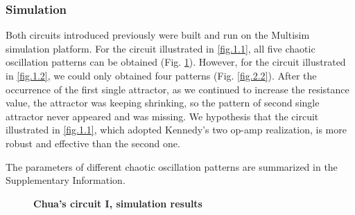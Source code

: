 \documentclass[10pt,a4paper,twocolumn,twoside,UTF8]{article}
\begin{document}
		\subsubsection{Simulation}
			Both circuits introduced previously were built and run on the Multisim simulation platform. 
			For the circuit illustrated in \ref{fig.1.1}, all five chaotic oscillation patterns can be obtained (Fig. \ref{fig.2.1}).
			However, for the circuit illustrated in \ref{fig.1.2}, we could only obtained four patterns (Fig. \ref{fig.2.2}).
			After the occurrence of the first single attractor, as we continued to increase the resistance value, the attractor was keeping shrinking, so the pattern of second single attractor never appeared and was missing.
			We hypothesis that the circuit illustrated in \ref{fig.1.1}, which adopted Kennedy's two op-amp realization\autocite{prakashChuaCircuitParadigm2020}, is more robust and effective than the second one.

			The parameters of different chaotic oscillation patterns are summarized in the Supplementary Information.
			\begin{figure}[htbp]
				\centering
				
				\caption{\textbf{Chua's circuit I, simulation results}}
				\label{fig.2.1}
			\end{figure}
		
\end{document}
